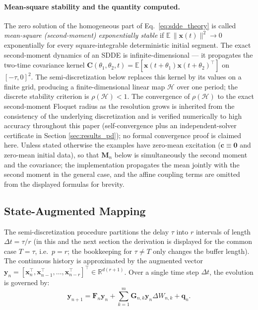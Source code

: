 \documentclass[preprint,12pt]{elsarticle}
\begin{document}
\paragraph{Mean-square stability and the quantity computed.}
The zero solution of the homogeneous part of Eq.~\eqref{eq:sdde_theory} is called \emph{mean-square (second-moment) exponentially stable} if $\mathbb{E}\,\|\mathbf{x}(t)\|^2 \to 0$ exponentially for every square-integrable deterministic initial segment. The exact second-moment dynamics of an SDDE is infinite-dimensional --- it propagates the two-time covariance kernel $\mathbf{C}(\theta_1,\theta_2,t) = \mathbb{E}[\mathbf{x}(t+\theta_1)\mathbf{x}(t+\theta_2)^\top]$ on $[-\tau,0]^2$. The semi-discretization below replaces this kernel by its values on a finite grid, producing a finite-dimensional linear map $\mathcal{H}$ over one period; the discrete stability criterion is $\rho(\mathcal{H}) < 1$. The convergence of $\rho(\mathcal{H})$ to the exact second-moment Floquet radius as the resolution grows is inherited from the consistency of the underlying discretization \cite{Sykora2019,Sykora2020a} and is verified numerically to high accuracy throughout this paper (self-convergence plus an independent-solver certificate in Section \ref{sec:results_pd}); no formal convergence proof is claimed here. Unless stated otherwise the examples have zero-mean excitation ($\mathbf{c}\equiv\mathbf{0}$ and zero-mean initial data), so that $\mathbf{M}_n$ below is simultaneously the second moment and the covariance; the implementation propagates the mean jointly with the second moment in the general case, and the affine coupling terms are omitted from the displayed formulas for brevity.

\subsection{State-Augmented Mapping}
The semi-discretization procedure partitions the delay $\tau$ into $r$ intervals of length $\Delta t = \tau/r$ (in this and the next section the derivation is displayed for the common case $T = \tau$, i.e.\ $p = r$; the bookkeeping for $\tau \ne T$ only changes the buffer length). The continuous history is approximated by the augmented vector $\mathbf{y}_n = [\mathbf{x}_n^\top, \mathbf{x}_{n-1}^\top, \dots, \mathbf{x}_{n-r}^\top]^\top \in \mathbb{R}^{d(r+1)}$. Over a single time step $\Delta t$, the evolution is governed by:
\begin{equation}
\label{eq:discrete_map}
\mathbf{y}_{n+1} = \mathbf{F}_n \mathbf{y}_n + \sum_{k=1}^m \mathbf{G}_{n,k} \mathbf{y}_n \Delta W_{n,k} + \mathbf{q}_n.
\end{equation}
\end{document}
